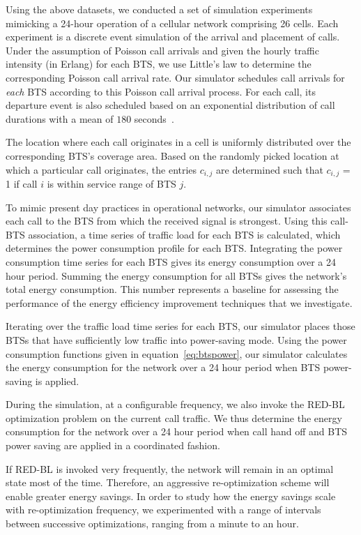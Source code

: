 Using the above datasets, we conducted a set of simulation experiments mimicking a 24-hour operation of a cellular network comprising 26 cells.
Each experiment is a discrete event simulation of the arrival and placement of calls.
Under the assumption of Poisson call arrivals and given the hourly traffic intensity (in Erlang) for each BTS, we use Little's law to determine the corresponding Poisson call arrival rate.
Our simulator schedules call arrivals for \emph{each} BTS according to this Poisson call arrival process.
For each call, its departure event is also scheduled based on an exponential distribution of call durations with a mean of $180$ seconds~\cite{Gerla:1995:MMM:276418.276421}.

The location where each call originates in a cell is uniformly distributed over the corresponding BTS's coverage area. Based on the randomly picked location at which a particular call originates, the entries $c_{i,j}$ are determined such that $c_{i,j}$ = 1 if call $i$ is within service range of BTS $j$.

To mimic present day practices in operational networks, our simulator associates each call to the BTS from which the received signal is strongest. Using this call-BTS association, a time series of traffic load for each BTS is calculated, which determines the power consumption profile for each BTS. Integrating the power consumption time series for each BTS gives its energy consumption over a 24 hour period. Summing the energy consumption for all BTSs gives the network's total energy consumption. This number represents a baseline for assessing the performance of the energy efficiency improvement techniques that we investigate.

Iterating over the traffic load time series for each BTS, our simulator places those BTSs that have sufficiently low traffic into power-saving mode. Using the power consumption functions given in equation~\ref{eq:btspower}, our simulator calculates the energy consumption for the network over a 24 hour period when BTS power-saving is applied.

During the simulation, at a configurable frequency, we also invoke the RED-BL optimization problem on the current call traffic. We thus determine the energy consumption for the network over a 24 hour period when call hand off and BTS power saving are applied in a coordinated fashion.

If RED-BL is invoked very frequently, the network will remain in an optimal state most of the time. Therefore, an aggressive re-optimization scheme will enable greater energy savings. In order to study how the energy savings scale with re-optimization frequency, we experimented with a range of intervals between successive optimizations, ranging from a minute to an hour.

